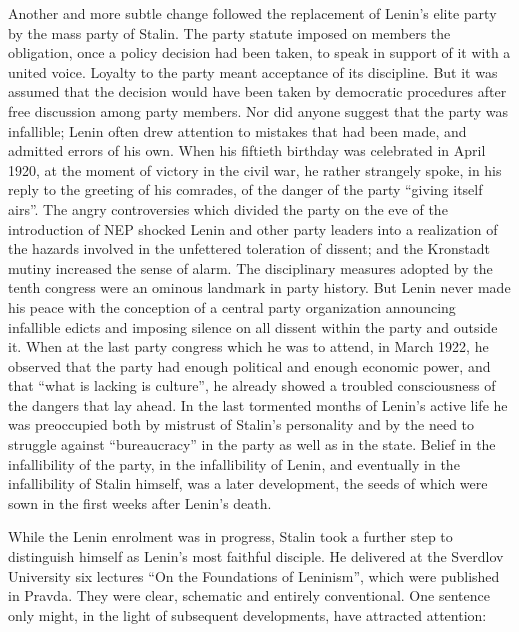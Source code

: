 Another and more subtle change followed the replacement of Lenin's elite party by the mass party of Stalin. The party statute imposed on members the obligation, once a policy decision had been taken, to speak in support of it with a united voice. Loyalty to the party meant acceptance of its discipline. But it was assumed that the decision would have been taken by democratic procedures after free discussion among party members. Nor did anyone suggest that the party was infallible; Lenin often drew attention to mistakes that had been made, and admitted errors of his own. When his fiftieth birthday was celebrated in April 1920, at the moment of victory in the civil war, he rather strangely spoke, in his reply to the greeting of his comrades, of the danger of the party ``giving itself airs''. The angry controversies which divided the party on the eve of the introduction of NEP shocked Lenin and other party leaders into a realization of the hazards involved in the unfettered toleration of dissent; and the Kronstadt mutiny increased the sense of alarm. The disciplinary measures adopted by the tenth congress were an ominous landmark in party history. But Lenin never made his peace with the conception of a central party organization announcing infallible edicts and imposing silence on all dissent within the party and outside it. When at the last party congress which he was to attend, in March 1922, he observed that the party had enough political and enough economic power, and that ``what is lacking is culture'', he already showed a troubled consciousness of the dangers that lay ahead. In the last tormented months of Lenin's active life he was preoccupied both by mistrust of Stalin's personality and by the need to struggle against ``bureaucracy'' in the party as well as in the state. Belief in the infallibility of the party, in the infallibility of Lenin, and eventually in the infallibility of Stalin himself, was a later development, the seeds of which were sown in the first weeks after Lenin's death. 

While the Lenin enrolment was in progress, Stalin took a further step to distinguish himself as Lenin's most faithful disciple. He delivered at the Sverdlov University six lectures ``On the Foundations of Leninism'', which were published in Pravda. They were clear, schematic and entirely conventional. One sentence only might, in the light of subsequent developments, have attracted attention: 

